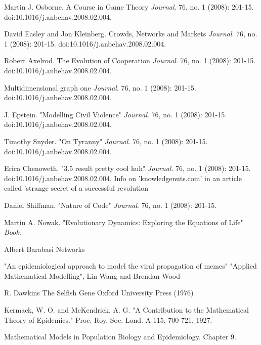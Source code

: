 \begin{thebibliography}{9}
	Martin J. Osborne. A Course in Game Theory
	\textit{Journal}. 
	76, no. 1 (2008): 201-15. doi:10.1016/j.anbehav.2008.02.004.
	
	David Easley and Jon Kleinberg. Crowds, Networks and Markets
	\textit{Journal}. 
	76, no. 1 (2008): 201-15. doi:10.1016/j.anbehav.2008.02.004.
	
	Robert Axelrod. The Evolution of Cooperation
	\textit{Journal}. 
	76, no. 1 (2008): 201-15. doi:10.1016/j.anbehav.2008.02.004.
	
	Multidimensional graph one
	\textit{Journal}. 
	76, no. 1 (2008): 201-15. doi:10.1016/j.anbehav.2008.02.004. 
	
	J. Epstein. "Modelling Civil Violence"
	\textit{Journal}. 
	76, no. 1 (2008): 201-15. doi:10.1016/j.anbehav.2008.02.004. 
	
	Timothy Snyder. "On Tyranny"
	\textit{Journal}. 
	76, no. 1 (2008): 201-15. doi:10.1016/j.anbehav.2008.02.004. 
	
	Erica Chenoweth. "3.5 result pretty cool huh"
	\textit{Journal}. 
	76, no. 1 (2008): 201-15. doi:10.1016/j.anbehav.2008.02.004. Info on 'knowledgenuts.com' in an article called 'strange secret of a successful revolution
	
	Daniel Shiffman. "Nature of Code"
	\textit{Journal}. 
	76, no. 1 (2008): 201-15.
	
	Martin A. Nowak. "Evolutionary Dynamics: Exploring the Equations of Life"
	\textit{Book}. 
	
	Albert Barabasi Networks
	
	"An epidemiological approach to model the viral propagation of memes" "Applied Mathematical Modelling",  Lin Wang and Brendan Wood
	
	R. Dawkins
	The Selfish Gene
	Oxford University Press (1976)
	
	Kermack, W. O. and McKendrick, A. G. "A Contribution to the Mathematical Theory of Epidemics." Proc. Roy. Soc. Lond. A 115, 700-721, 1927. 
	
	Mathematical Models in Population Biology and Epidemiology. Chapter 9.
	
\end{thebibliography}